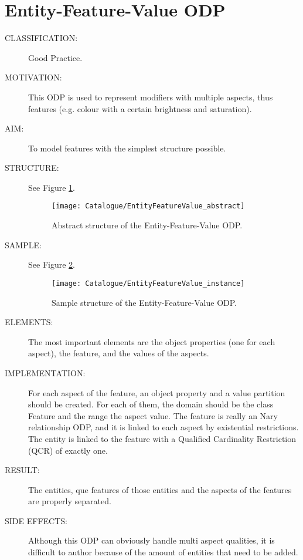  \section{Entity-Feature-Value ODP}\begin{description}
\item [CLASSIFICATION:] Good Practice.

\item [MOTIVATION:] This ODP is used to represent modifiers with multiple aspects, thus features (e.g. colour with a certain brightness and saturation).

\item [AIM:] To model features with the simplest structure possible.

\item [STRUCTURE:] See Figure \ref{odp:EntityFeatureValue_abstract}.
\begin{figure}[]\centering\texttt{[image: Catalogue/EntityFeatureValue\_abstract]}\caption{\label{odp:EntityFeatureValue_abstract} Abstract structure of the Entity-Feature-Value ODP.}\end{figure}

\item [SAMPLE:] See Figure \ref{odp:EntityFeatureValue_instance}.
\begin{figure}[]\centering\texttt{[image: Catalogue/EntityFeatureValue\_instance]}\caption{\label{odp:EntityFeatureValue_instance} Sample structure of the Entity-Feature-Value ODP.}\end{figure}

\item [ELEMENTS:] The most important elements are the object properties (one for each aspect), the feature, and the values of the aspects.

\item [IMPLEMENTATION:] For each aspect of the feature, an object property and a value partition should be created. For each of them, the domain should be the class Feature and the range the aspect value. The feature is really an Nary relationship ODP, and it is linked to each aspect by existential restrictions. The entity is linked to the feature with a Qualified Cardinality Restriction (QCR) of exactly one.

\item [RESULT:] The entities, que features of those entities and the aspects of the features are properly separated.

\item [SIDE EFFECTS:] Although this ODP can obviously handle multi aspect qualities, it is difficult to author because of the amount of entities that need to be added.


\end{description}
